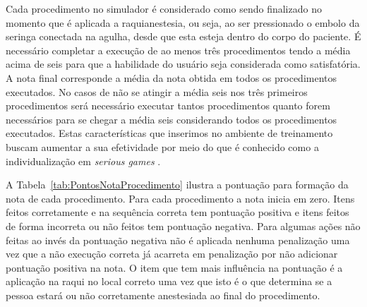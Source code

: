 Cada procedimento no simulador é considerado como sendo finalizado no momento que é aplicada a raquianestesia, ou seja, ao ser pressionado o embolo da seringa conectada na agulha, desde que esta esteja dentro do corpo do paciente.
É necessário completar a execução de ao menos três procedimentos tendo a média acima de seis para que a habilidade do usuário seja considerada como satisfatória. A nota final corresponde a média da nota obtida em todos os procedimentos executados. No casos de não se atingir a média seis nos três primeiros procedimentos será necessário executar tantos procedimentos quanto forem necessários para se chegar a média seis considerando todos os procedimentos executados. Estas características que inserimos no ambiente de treinamento buscam aumentar a sua efetividade por meio do que é conhecido como a individualização em \textit{serious games} \cite{Sajjadi2022}.

A Tabela~\ref{tab:PontosNotaProcedimento} ilustra a pontuação para formação da nota de cada procedimento. Para cada procedimento a nota inicia em zero. Itens feitos corretamente e na sequência correta tem pontuação positiva e itens feitos de forma incorreta ou não feitos tem pontuação negativa. Para algumas ações não feitas ao invés da pontuação negativa não é aplicada nenhuma penalização uma vez que a não execução correta já acarreta em penalização por não adicionar pontuação positiva na nota. O item que tem mais influência na pontuação é a aplicação na raqui no local correto uma vez que isto é o que determina se a pessoa estará ou não corretamente anestesiada ao final do procedimento.

